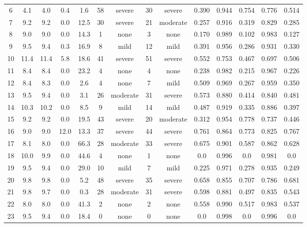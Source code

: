 \documentclass[5p,twocolumn,lefttitle]{elsarticle}
\begin{document}
\begin{table*}[tb]
{\begin{tabular}{c|cccccc|ccccccc}
6      & 4.1  & 4.0 & 0.4 & 1.6 & 58 & severe   & 30 & severe   & 0.390 & 0.944 & 0.754 & 0.776 & 0.514 \\
7      & 9.2  & 9.2 & 0.0 & 12.5 & 30 & severe   & 21 & moderate & 0.257 & 0.916 & 0.319 & 0.829 & 0.285 \\
8  & 9.0  & 9.0 & 0.0 & 14.3 & 1  & none     & 3  & none     & 0.170 & 0.989 & 0.102 & 0.983 & 0.127 \\
9  & 9.5  & 9.4 & 0.3 & 16.9 & 8  & mild     & 12 & mild     & 0.391 & 0.956 & 0.286 & 0.931 & 0.330 \\
10 & 11.4 & 11.4 & 5.8 & 18.6 & 41 & severe   & 51 & severe   & 0.552 & 0.753 & 0.467 & 0.697 & 0.506 \\
11     & 8.4  & 8.4 & 0.0 & 23.2 & 4  & none     & 4  & none     & 0.238 & 0.982 & 0.215 & 0.967 & 0.226 \\
12     & 8.4  & 8.3 & 0.0 & 2.6 & 4  & none     & 7  & mild     & 0.509 & 0.969 & 0.267 & 0.959 & 0.350 \\
13     & 9.5  & 9.4 & 0.0 & 3.1 & 26 & moderate & 31 & severe   & 0.573 & 0.880 & 0.414 & 0.840 & 0.481 \\
14 & 10.3 & 10.2 & 0.0 & 8.5 & 9  & mild     & 14 & mild     & 0.487 & 0.919 & 0.335 & 0.886 & 0.397 \\
15     & 9.2  & 9.2 & 0.0 & 19.5 & 43 & severe   & 20 & moderate & 0.312 & 0.954 & 0.778 & 0.737 & 0.446 \\
16     & 9.0  & 9.0 & 12.0 & 13.3 & 37 & severe   & 44 & severe   & 0.761 & 0.864 & 0.773 & 0.825 & 0.767 \\
17 & 8.1  & 8.0 & 0.0 & 66.3 & 28 & moderate & 33 & severe   & 0.675 & 0.901 & 0.587 & 0.862 & 0.628 \\
18 & 10.0 & 9.9 & 0.0 & 44.6 & 4  & none     & 1  & none     & 0.0   & 0.996 & 0.0   & 0.981 & 0.0   \\
19     & 9.5  & 9.4 & 0.0 & 29.0 & 10 & mild     & 7  & mild     & 0.225 & 0.971 & 0.278 & 0.935 & 0.249 \\
20 & 9.8  & 9.8 & 0.0 & 5.2 & 48 & severe   & 35 & severe   & 0.658 & 0.855 & 0.707 & 0.786 & 0.681 \\
21     & 9.8  & 9.7 & 0.0 & 0.3 & 28 & moderate & 31 & severe   & 0.598 & 0.881 & 0.497 & 0.835 & 0.543 \\
22     & 8.0  & 8.0 & 0.0 & 41.3 & 2  & none     & 2  & none     & 0.558 & 0.990 & 0.517 & 0.983 & 0.537 \\
23     & 9.5  & 9.4 & 0.0 & 18.4 & 0  & none     & 0  & none     & 0.0   & 0.998 & 0.0   & 0.996 & 0.0   \\

\end{tabular}}
\end{table*}
\end{document}
